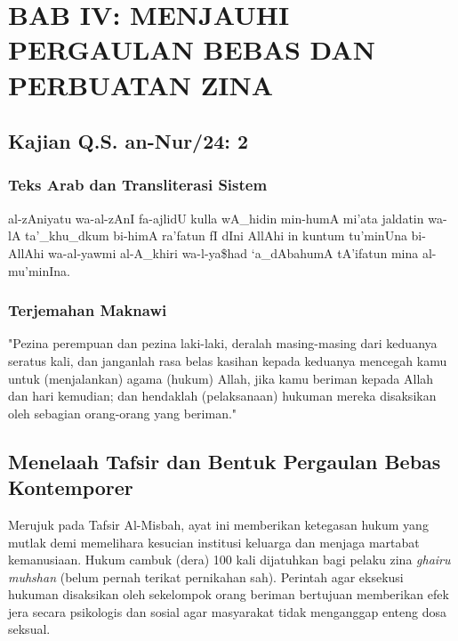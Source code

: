 \documentclass[12pt, a4paper]{article}
\begin{document}
\newpage

\section{BAB IV: MENJAUHI PERGAULAN BEBAS DAN PERBUATAN ZINA}

\subsection{Kajian Q.S. an-Nur/24: 2}

\subsubsection{Teks Arab dan Transliterasi Sistem}
\begin{center}
\begin{arabtext}
al-zAniyatu wa-al-zAnI fa-ajlidU kulla wA_hidin min-humA mi'ata jaldatin wa-lA ta'_khu_dkum bi-himA ra'fatun fI dIni AllAhi in kuntum tu'minUna bi-AllAhi wa-al-yawmi al-A_khiri wa-l-ya\$had `a_dAbahumA tA'ifatun mina al-mu'minIna.
\end{arabtext}
\end{center}

\subsubsection{Terjemahan Maknawi}
"Pezina perempuan dan pezina laki-laki, deralah masing-masing dari keduanya seratus kali, dan janganlah rasa belas kasihan kepada keduanya mencegah kamu untuk (menjalankan) agama (hukum) Allah, jika kamu beriman kepada Allah dan hari kemudian; dan hendaklah (pelaksanaan) hukuman mereka disaksikan oleh sebagian orang-orang yang beriman."

\subsection{Menelaah Tafsir dan Bentuk Pergaulan Bebas Kontemporer}
Merujuk pada Tafsir Al-Misbah, ayat ini memberikan ketegasan hukum yang mutlak demi memelihara kesucian institusi keluarga dan menjaga martabat kemanusiaan. Hukum cambuk (dera) 100 kali dijatuhkan bagi pelaku zina \textit{ghairu muhshan} (belum pernah terikat pernikahan sah). Perintah agar eksekusi hukuman disaksikan oleh sekelompok orang beriman bertujuan memberikan efek jera secara psikologis dan sosial agar masyarakat tidak menganggap enteng dosa seksual.
\end{document}
